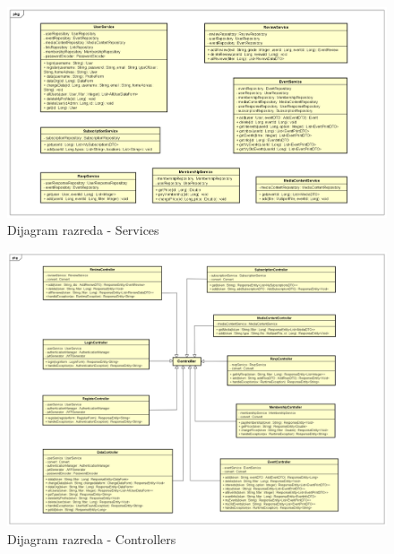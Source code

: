 			\vspace{-0.5cm}
			
			\begin{figure}[H]
				\includegraphics[width=\textwidth]{dijagrami/cd5.png} 
				\centering
				\vspace{-0.5cm}
				\caption{Dijagram razreda - Services}
				\label{cd5}
			\end{figure}
			
			\begin{figure}[H]
				\includegraphics[width=\textwidth]{dijagrami/cd3.png} 
				\centering
				\vspace{-0.4cm}
				\caption{Dijagram razreda - Controllers}
				\label{cd3}
			\end{figure}
			
				
			
